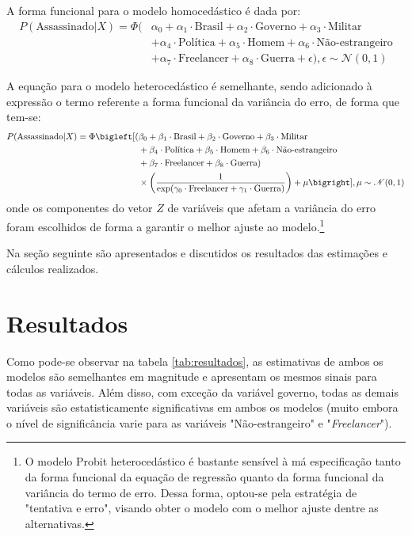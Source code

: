 \documentclass[12pt,
               openright,
               oneside,
               a4paper,
							 section=TITLE,     %
               subsection=Title,  %
               english,brazil]{article}
\begin{document}
A forma funcional para o modelo homocedástico é dada por:
\begin{equation}
\begin{aligned}
P(\text{Assassinado} | X) = \Phi(&\alpha_0 + \alpha_1 \cdot \text{Brasil}  + \alpha_2 \cdot \text{Governo} + \alpha_3 \cdot \text{Militar} \\ &+ \alpha_4 \cdot \text{Política} + \alpha_5 \cdot \text{Homem} + \alpha_6 \cdot \text{Não-estrangeiro} \\ &+ \alpha_7 \cdot \text{Freelancer} + \alpha_8 \cdot \text{Guerra} + \epsilon), \epsilon \sim \mathcal{N}(0,1) 
\end{aligned}
\end{equation}

A equação para o modelo heterocedástico é semelhante, sendo adicionado à expressão o termo referente a forma funcional da variância do erro, de forma que tem-se:
\begin{equation}
\begin{aligned}
P(\text{Assassinado} | X) = \Phi \bigleft[ (&\beta_0 + \beta_1 \cdot \text{Brasil}  + \beta_2 \cdot \text{Governo} + \beta_3 \cdot \text{Militar} \\ &+ \beta_4 \cdot \text{Política} + \beta_5 \cdot \text{Homem} + \beta_6 \cdot \text{Não-estrangeiro} \\ &+ \beta_7 \cdot \text{Freelancer} + \beta_8 \cdot \text{Guerra}) \\ &\times \left( \frac{1}{\exp(\gamma_0 \cdot \text{Freelancer} + \gamma_1 \cdot \text{Guerra})} \right) + \mu \bigright], \mu \sim \mathcal{N}(0,1) 
\end{aligned}
\end{equation}
onde os componentes do vetor $Z$ de variáveis que afetam a variância do erro foram escolhidos de forma a garantir o melhor ajuste ao modelo.\footnote[7]{O modelo Probit heterocedástico é bastante sensível à má especificação tanto da forma funcional da equação de regressão quanto da forma funcional da variância do termo de erro. Dessa forma, optou-se pela estratégia de "tentativa e erro", visando obter o modelo com o melhor ajuste dentre as alternativas.}

Na seção seguinte são apresentados e discutidos os resultados das estimações e cálculos realizados.

\section{Resultados}

Como pode-se observar na tabela \ref{tab:resultados}, as estimativas de ambos os modelos são semelhantes em magnitude e apresentam os mesmos sinais para todas as variáveis. Além disso, com exceção da variável governo, todas as demais variáveis são estatisticamente significativas em ambos os modelos (muito embora o nível de significância varie para as variáveis "Não-estrangeiro" e "\textit{Freelancer}").
\end{document}
